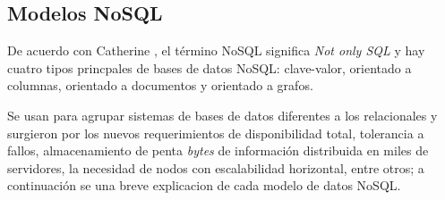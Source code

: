 \subsection{Modelos NoSQL}
De acuerdo con Catherine \cite{cristina_marta_bender_topicos_nodate}, el término NoSQL significa \textit{Not only SQL} y hay cuatro tipos princpales de bases de datos NoSQL: clave-valor, orientado a columnas, orientado a documentos y orientado a grafos. 


Se usan para agrupar sistemas de bases de datos diferentes a los relacionales y surgieron por los nuevos requerimientos de disponibilidad total, tolerancia a fallos, almacenamiento de penta \textit{bytes} de información distribuida en miles de servidores, la necesidad de nodos con escalabilidad horizontal, entre otros; a continuación se una breve explicacion de cada modelo de datos NoSQL.
